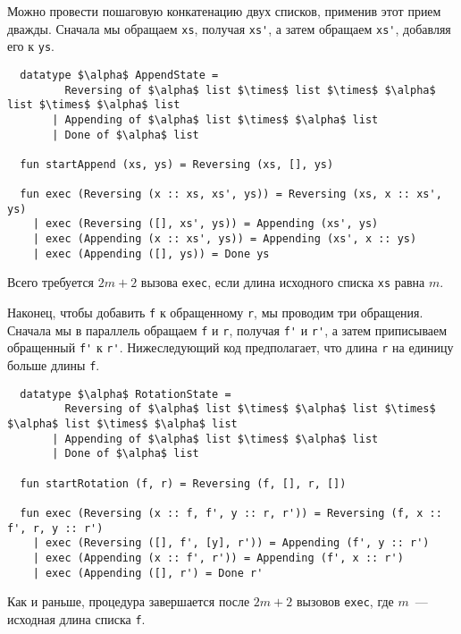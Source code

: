 Можно провести пошаговую конкатенацию двух списков, применив этот
прием дважды. Сначала мы обращаем \lstinline!xs!, получая
\lstinline!xs'!, а затем обращаем \lstinline!xs'!, добавляя его к
\lstinline!ys!.
\begin{lstlisting}
  datatype $\alpha$ AppendState =
         Reversing of $\alpha$ list $\times$ list $\times$ $\alpha$ list $\times$ $\alpha$ list
       | Appending of $\alpha$ list $\times$ $\alpha$ list
       | Done of $\alpha$ list

  fun startAppend (xs, ys) = Reversing (xs, [], ys)

  fun exec (Reversing (x :: xs, xs', ys)) = Reversing (xs, x :: xs', ys)
    | exec (Reversing ([], xs', ys)) = Appending (xs', ys)
    | exec (Appending (x :: xs', ys)) = Appending (xs', x :: ys)
    | exec (Appending ([], ys)) = Done ys
\end{lstlisting}
Всего требуется $2m + 2$ вызова \lstinline!exec!, если длина исходного
списка \lstinline!xs! равна $m$.

Наконец, чтобы добавить \lstinline!f! к обращенному \lstinline!r!, мы
проводим три обращения. Сначала мы в параллель обращаем \lstinline!f!
и \lstinline!r!, получая \lstinline!f'! и \lstinline!r'!, а затем
приписываем обращенный \lstinline!f'! к \lstinline!r'!. Нижеследующий
код предполагает, что длина \lstinline!r! на единицу больше длины
\lstinline!f!.
\begin{lstlisting}
  datatype $\alpha$ RotationState =
         Reversing of $\alpha$ list $\times$ $\alpha$ list $\times$ $\alpha$ list $\times$ $\alpha$ list
       | Appending of $\alpha$ list $\times$ $\alpha$ list
       | Done of $\alpha$ list

  fun startRotation (f, r) = Reversing (f, [], r, [])

  fun exec (Reversing (x :: f, f', y :: r, r')) = Reversing (f, x :: f', r, y :: r')
    | exec (Reversing ([], f', [y], r')) = Appending (f', y :: r')
    | exec (Appending (x :: f', r')) = Appending (f', x :: r')
    | exec (Appending ([], r') = Done r'
\end{lstlisting}
Как и раньше, процедура завершается после $2m + 2$ вызовов
\lstinline!exec!, где $m$~--- исходная длина списка \lstinline!f!.


